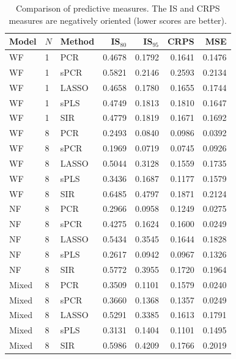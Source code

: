 \documentclass[12pt]{amsart}
\theoremstyle{plain}
\theoremstyle{definition}
\theoremstyle{remark}
\begin{document}
\begin{table}[h!]
  \centering
  {\small
\begin{tabular}{lll|rrr|r}
  \toprule
  \textbf{Model} & $N$ & \textbf{Method} & IS$_{80}$ & IS$_{95}$ & CRPS & MSE \\ 
  \midrule
  WF & 1 & PCR & 0.4678 & 0.1792 & 0.1641 & 0.1476 \\ 
  WF & 1 & sPCR & 0.5821 & 0.2146 & 0.2593 & 0.2134 \\ 
  WF & 1 & LASSO & 0.4658 & 0.1780 & 0.1655 & 0.1744 \\ 
  WF & 1 & sPLS & 0.4749 & 0.1813 & 0.1810 & 0.1647 \\ 
  WF & 1 & SIR & 0.4779 & 0.1819 & 0.1671 & 0.1692 \\
  \midrule
  WF & 8 & PCR & 0.2493 & 0.0840 & 0.0986 & 0.0392 \\ 
  WF & 8 & sPCR & 0.1969 & 0.0719 & 0.0745 & 0.0926 \\ 
  WF & 8 & LASSO & 0.5044 & 0.3128 & 0.1559 & 0.1735 \\ 
  WF & 8 & sPLS & 0.3436 & 0.1687 & 0.1177 & 0.1579 \\ 
  WF & 8 & SIR & 0.6485 & 0.4797 & 0.1871 & 0.2124 \\
  \midrule
  NF & 8 & PCR & 0.2966 & 0.0958 & 0.1249 & 0.0275 \\ 
  NF & 8 & sPCR & 0.4275 & 0.1624 & 0.1600 & 0.0249 \\ 
  NF & 8 & LASSO & 0.5434 & 0.3545 & 0.1644 & 0.1828 \\ 
  NF & 8 & sPLS & 0.2617 & 0.0942 & 0.0967 & 0.1326 \\ 
  NF & 8 & SIR & 0.5772 & 0.3955 & 0.1720 & 0.1964 \\
  \midrule
  Mixed & 8 & PCR & 0.3509 & 0.1101 & 0.1579 & 0.0240 \\ 
  Mixed & 8 & sPCR & 0.3660 & 0.1368 & 0.1357 & 0.0249 \\ 
  Mixed & 8 & LASSO & 0.5291 & 0.3385 & 0.1613 & 0.1791 \\ 
  Mixed & 8 & sPLS & 0.3131 & 0.1404 & 0.1101 & 0.1495 \\ 
  Mixed & 8 & SIR & 0.5986 & 0.4209 & 0.1766 & 0.2019 \\ 
   \bottomrule
\end{tabular}
}
\caption{Comparison of predictive measures. The IS and CRPS measures are
  negatively oriented (lower scores are better).}
\label{tab:comparisontot}
\end{table}
\end{document}
